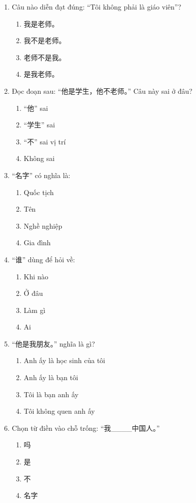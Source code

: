 \documentclass{article}
\begin{document}
\begin{CJK*}{UTF8}{gbsn}
\begin{multicols}{2}
\begin{enumerate}[label=\textbf{Câu \arabic*.}, leftmargin=*, itemsep=1.2em]
\item Câu nào diễn đạt đúng: “Tôi không phải là giáo viên”?
\begin{enumerate}[label=A.]
\item 我是老师。
\item 我不是老师。
\item 老师不是我。
\item 是我老师。
\end{enumerate}

\item Đọc đoạn sau: “他是学生，他不老师。” Câu này sai ở đâu?
\begin{enumerate}[label=A.]
\item “他” sai
\item “学生” sai
\item “不” sai vị trí
\item Không sai
\end{enumerate}

\item “名字” có nghĩa là:
\begin{enumerate}[label=A.]
\item Quốc tịch
\item Tên
\item Nghề nghiệp
\item Gia đình
\end{enumerate}

\item “谁” dùng để hỏi về:
\begin{enumerate}[label=A.]
\item Khi nào
\item Ở đâu
\item Làm gì
\item Ai
\end{enumerate}

\item “他是我朋友。” nghĩa là gì?
\begin{enumerate}[label=A.]
\item Anh ấy là học sinh của tôi
\item Anh ấy là bạn tôi
\item Tôi là bạn anh ấy
\item Tôi không quen anh ấy
\end{enumerate}

\item Chọn từ điền vào chỗ trống: “我____中国人。”
\begin{enumerate}[label=A.]
\item 吗
\item 是
\item 不
\item 名字
\end{enumerate}


\end{enumerate}
\end{multicols}
\end{CJK*}
\end{document}
